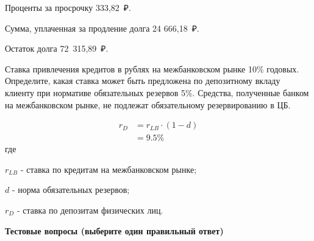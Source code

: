 \documentclass[12pt, table]{exam}
\begin{document}
\begin{questions}
\begin{subparts}
\begin{solution}[6em]
		Проценты за просрочку 333,82~₽.
		
		Сумма, уплаченная за продление долга 24 666,18~₽. 
		
		Остаток долга 72~315,89~₽.
	\end{solution}
	
\end{subparts}
\addpoints

\pagebreak
\question[10] Ставка привлечения кредитов в рублях на межбанковском рынке 10\% годовых. Определите, какая ставка может быть предложена по депозитному вкладу клиенту при нормативе обязательных резервов 5\%. Средства, полученные банком на межбанковском рынке, не подлежат обязательному резервированию в ЦБ.
\begin{solution}[10em]
	\begin{align}
	r_D&=r_{LB} \cdot (1-d)\\
	&=9.5\%\nonumber
	\end{align}
	где
	
	$r_{LB}$ - ставка по кредитам на межбанковском рынке;
	
	$d$ - норма обязательных резервов;
	
	$r_D$ - ставка по депозитам физических лиц.
	
\end{solution}


\end{questions}

\pagebreak
\noindent\textbf{Тестовые вопросы (выберите один правильный ответ)}
\end{document}
